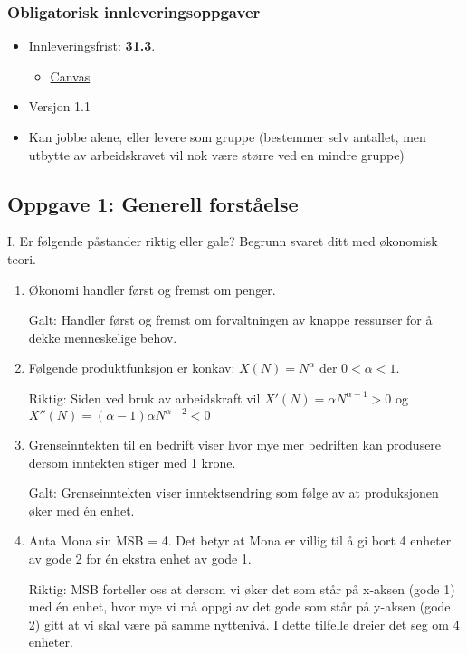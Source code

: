 \documentclass[
  letterpaper,
  DIV=11,
  numbers=noendperiod]{scrartcl}
\author{}
\date{}
\providecommand{\tightlist}{%
  \setlength{\itemsep}{0pt}\setlength{\parskip}{0pt}}\usepackage{longtable,booktabs,array}
\begin{document}
\newpage

\subsubsection{Obligatorisk
innleveringsoppgaver}\label{obligatorisk-innleveringsoppgaver}

\begin{itemize}
\tightlist
\item
  Innleveringsfrist: \textbf{31.3}.

  \begin{itemize}
  \tightlist
  \item
    \href{https://hiof.instructure.com/courses/8577/assignments/38559}{Canvas}
  \end{itemize}
\item
  Versjon 1.1
\item
  Kan jobbe alene, eller levere som gruppe (bestemmer selv antallet, men
  utbytte av arbeidskravet vil nok være større ved en mindre gruppe)
\end{itemize}

\subsection{Oppgave 1: Generell
forståelse}\label{oppgave-1-generell-forstuxe5else}

I. Er følgende påstander riktig eller gale? Begrunn svaret ditt med
økonomisk teori.

\begin{enumerate}
\def\labelenumi{\alph{enumi}.}
\tightlist
\item
  Økonomi handler først og fremst om penger.

  Galt: Handler først og fremst om forvaltningen av knappe ressurser for
  å dekke menneskelige behov.
\item
  Følgende produktfunksjon er konkav:
  \(X(N)=N^{\alpha} \text{ der } 0<\alpha<1.\)

  Riktig: Siden ved bruk av arbeidskraft vil
  \(X'(N)=\alpha N^{\alpha-1} >0\) og
  \(X''(N)=(\alpha-1)\alpha N^{\alpha-2} <0\)
\item
  Grenseinntekten til en bedrift viser hvor mye mer bedriften kan
  produsere dersom inntekten stiger med 1 krone.

  Galt: Grenseinntekten viser inntektsendring som følge av at
  produksjonen øker med én enhet.
\item
  Anta Mona sin MSB = 4. Det betyr at Mona er villig til å gi bort 4
  enheter av gode 2 for én ekstra enhet av gode 1.

  Riktig: MSB forteller oss at dersom vi øker det som står på x-aksen
  (gode 1) med én enhet, hvor mye vi må oppgi av det gode som står på
  y-aksen (gode 2) gitt at vi skal være på samme nyttenivå. I dette
  tilfelle dreier det seg om 4 enheter.
\end{enumerate}
\end{document}
